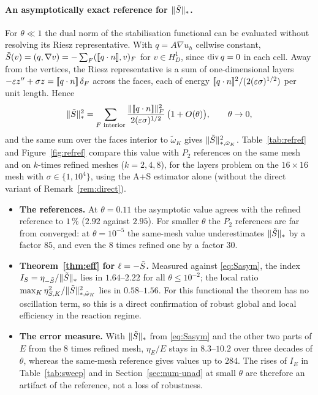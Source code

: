 

{\color{teal}
\paragraph{An asymptotically exact reference for $\|\tilde S\|_*$.} For $\theta\ll1$ the dual norm of the
stabilisation functional can be evaluated without resolving its Riesz representative. With
$q=A\nabla u_h$ cellwise constant, $\tilde S(v)=(q,\nabla v)=-\sum_F([\![q\cdot n]\!],v)_F$ for $v\in H^1_D$, since
$\operatorname{div} q=0$ in each cell. Away from the vertices, the Riesz representative is a sum of one-dimensional layers
$-\varepsilon z''+\sigma z=[\![q\cdot n]\!]\,\delta_F$ across the faces, each of energy
$[\![q\cdot n]\!]^2/(2(\varepsilon\sigma)^{1/2})$ per unit length. Hence
\begin{equation}\label{eq:Sasym}
  \|\tilde S\|_*^2=\sum_{F\text{ interior}}\frac{\|[\![q\cdot n]\!]\|_F^2}{2(\varepsilon\sigma)^{1/2}}\,\bigl(1+O(\theta)\bigr),
  \qquad \theta\to0,
\end{equation}
and the same sum over the faces interior to $\tilde\omega_K$ gives $\|\tilde S\|_{*,\tilde\omega_K}^2$.
Table~\ref{tab:refref} and Figure~\ref{fig:refref} compare this value with $P_2$ references on the same mesh and on
$k$-times refined meshes ($k=2,4,8$), for the layers problem on the $16\times16$ mesh with $\sigma\in\{1,10^4\}$, using
the A+S estimator alone (without the direct variant of Remark~\ref{rem:direct}).
\begin{itemize}
  \item \textbf{The references.} At $\theta=0.11$ the asymptotic value agrees with the refined reference to $1\,\%$
  ($2.92$ against $2.95$). For smaller $\theta$ the $P_2$ references are far from converged: at $\theta=10^{-5}$ the
  same-mesh value underestimates $\|\tilde S\|_*$ by a factor $85$, and even the $8$ times refined one by a factor $30$.
  \item \textbf{Theorem~\ref{thm:eff} for $\ell=-\tilde S$.} Measured against \eqref{eq:Sasym}, the index
  $I_S=\eta_{-\tilde S}/\|\tilde S\|_*$ lies in $1.64$--$2.22$ for all $\theta\le10^{-2}$; the local ratio
  $\max_K\eta_{S,K}^2/\|\tilde S\|_{*,\tilde\omega_K}^2$ lies in $0.58$--$1.56$. For this functional the theorem has no
  oscillation term, so this is a direct confirmation of robust global and local efficiency in the reaction regime.
  \item \textbf{The error measure.} With $\|\tilde S\|_*$ from \eqref{eq:Sasym} and the other two parts of $E$ from the
  $8$ times refined mesh, $\eta_E/E$ stays in $8.3$--$10.2$ over three decades of $\theta$, whereas the same-mesh
  reference gives values up to $284$. The rises of $I_E$ in Table~\ref{tab:sweep} and in Section~\ref{sec:num-unad} at
  small $\theta$ are therefore an artifact of the reference, not a loss of robustness.
\end{itemize}
}

